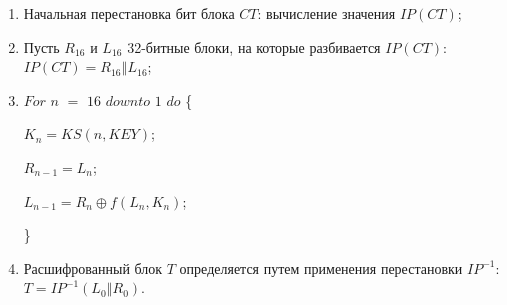 \documentclass{./civarticle}
\begin{document}
\begin{enumerate}
    \item Начальная перестановка бит блока $CT$: вычисление значения $IP(CT)$;
    \item Пусть $R_{16}$ и $L_{16}$ 32-битные блоки, на которые разбивается $IP(CT)$: $IP(CT) = R_{16} \mathbin\Vert L_{16}$;
    \item $For$ $n$ $=$ $16$ $downto$ $1$ $do$ \{ 

    \hspace{0.5cm} $K_n = KS(n, KEY)$;
    
    \hspace{0.5cm} $R_{n-1} = L_{n}$;

    \hspace{0.5cm} $L_{n-1} = R_{n} \oplus f(L_{n}, K_n)$;
    
\}

    \item Расшифрованный блок $T$ определяется путем применения перестановки $IP^{-1}$: $T = IP^{-1}(L_{0} \mathbin\Vert R_{0})$.

\end{enumerate}
\end{document}

